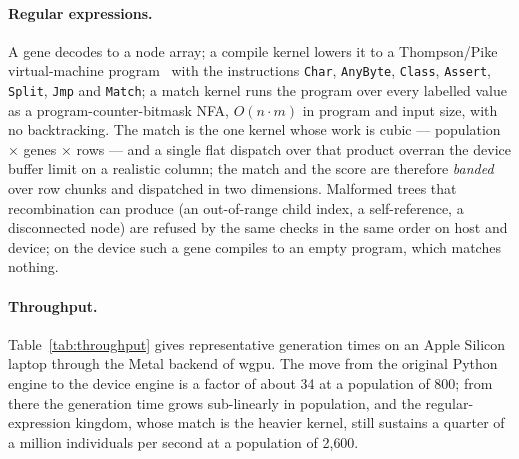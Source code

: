\documentclass[sigconf,nonacm]{acmart}
\begin{document}
\paragraph{Regular expressions.} A gene decodes to a node array; a compile kernel
lowers it to a Thompson/Pike virtual-machine
program~\cite{thompson1968regex,cox2007regex,cox2009regexvm} with the
instructions \texttt{Char}, \texttt{AnyByte}, \texttt{Class}, \texttt{Assert},
\texttt{Split}, \texttt{Jmp} and \texttt{Match}; a match kernel runs the program
over every labelled value as a program-counter-bitmask NFA, $O(n\cdot m)$ in
program and input size, with no backtracking. The match is the one kernel whose
work is cubic --- population $\times$ genes $\times$ rows --- and a single flat
dispatch over that product overran the device buffer limit on a realistic column;
the match and the score are therefore \emph{banded} over row chunks and
dispatched in two dimensions. Malformed trees that recombination can produce (an
out-of-range child index, a self-reference, a disconnected node) are refused by
the same checks in the same order on host and device; on the device such a gene
compiles to an empty program, which matches nothing.

\paragraph{Throughput.} Table~\ref{tab:throughput} gives representative
generation times on an Apple Silicon laptop through the Metal backend of wgpu.
The move from the original Python engine to the device engine is a factor of
about 34 at a population of 800; from there the generation time grows
sub-linearly in population, and the regular-expression kingdom, whose match is
the heavier kernel, still sustains a quarter of a million individuals per second
at a population of 2{,}600.
\end{document}
